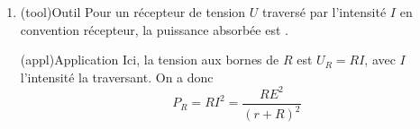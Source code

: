 \documentclass[../../main/main.tex]{subfiles}
\begin{document}
{\begin{enumerate}
		\item
		      \begin{tcbraster}[raster columns=2, raster equal height=rows]
			      \begin{tcb}(tool){Outil}
				      Pour un récepteur de tension $U$ traversé par l'intensité $I$ en
				      convention récepteur, la puissance absorbée est .
			      \end{tcb}
			      \begin{tcb}(appl){Application}
				      Ici, la tension aux bornes de $R$ est $U_R = RI$, avec $I$ l'intensité
				      la traversant. On a donc
				      \begin{equation*}
					      \boxed{P_R = RI^2 = \frac{RE^2}{(r+R)^2}}
				      \end{equation*}
			      \end{tcb}
		      \end{tcbraster}


\end{enumerate}}
\end{document}
